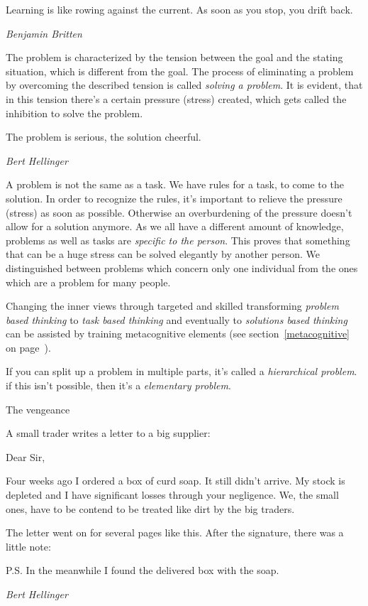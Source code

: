 \documentclass[../main.tex]{subfiles}
\begin{document}
\epigraph{Learning is like rowing against the current. As soon as you stop, you drift back.}{\textit{Benjamin Britten}}

The problem is characterized by the tension between the goal and the stating situation, which is different from the goal.
The process of eliminating a problem by overcoming the described tension is called \emph{solving a problem}.
It is evident, that in this tension there's a certain pressure (stress) created, which gets called the inhibition to solve the problem.

\epigraph{The problem is serious, the solution cheerful.}{\textit{Bert Hellinger}}

A problem is not the same as a task. We have rules for a task, to come to the solution.
In order to recognize the rules, it's important to relieve the pressure (stress) as soon as possible. Otherwise an overburdening of the pressure doesn't allow for a solution anymore.
As we all have a different amount of knowledge, problems as well as tasks are \emph{specific to the person}. This proves that something that can be a huge stress can be solved elegantly by another person.
We distinguished between problems which concern only one individual from the ones which are a problem for many people.

Changing the inner views through targeted and skilled transforming \emph{problem based thinking} to \emph{task based thinking} and eventually to \emph{solutions based thinking} can be assisted by training metacognitive elements (see section~\ref{metacognitive} on page~\pageref{metacognitive}).

If you can split up a problem in multiple parts, it's called a \emph{hierarchical problem}. if this isn't possible, then it's a \emph{elementary problem}.

        \setlength{}
        \epigraph{The vengeance
          
          \vspace {5mm} \noindent A small trader writes a letter to a big supplier:
          
  Dear Sir,

  Four weeks ago I ordered a box of curd soap. It still didn't arrive. My stock is depleted and I have significant losses through your negligence. We, the small ones, have to be contend to be treated like dirt by the big traders.
  
  The letter went on for several pages like this. After the signature, there was a little note:
  
  P.S. In the meanwhile I found the delivered box with the soap.}{\textit{Bert Hellinger}}
        \setlength{}
\end{document}
